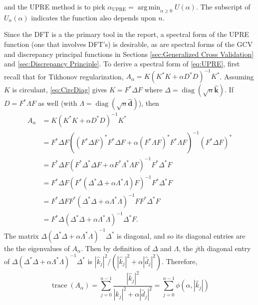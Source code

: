 \documentclass[12pt,notitlepage]{report}
\newcommand{\kVec}{\mathbf{k}}	%
\newcommand{\kMat}{K}	%
\newcommand{\dVec}{\mathbf{d}}	%
\newcommand{\ctrans}{*}	%
\DeclareMathOperator{\trace}{trace}		%
\DeclareMathOperator{\diag}{diag}	%
\newcommand{\regparam}{\alpha}
\DeclareMathOperator*{\argmin}{arg\,min}
\newcommand{\filt}{\phi}
\newcommand{\A}{A_{\regparam}}	%
\newcommand{\U}{U}	%
\begin{document}
and the UPRE method is to pick $\regparam_{\text{UPRE}} = \argmin_{\regparam \geq 0} \U(\regparam)$. The subscript of $\U_n(\regparam)$ indicates the function also depends upon $n$. \par 
Since the DFT is a the primary tool in the report, a spectral form of the UPRE function (one that involves DFT's) is desirable, as are spectral forms of the GCV and discrepancy principal functions in Sections \ref{sec:Generalized Cross Validation} and \ref{sec:Discrepancy Principle}. To derive a spectral form of \eqref{eq:UPRE}, first recall that for Tikhonov regularization, $\A = \kMat(\kMat^\ctrans\kMat + \regparam{D^\ctrans}D)^{-1}\kMat^\ctrans$. Assuming $\kMat$ is circulant, \eqref{eq:CircDiag} gives $\kMat = F^\ctrans\Delta{F}$ where $\Delta = \diag(\sqrt{n}\widehat{\kVec})$. If $D = F^\ctrans\Lambda{F}$ as well (with $\Lambda = \diag(\sqrt{n}\widehat{\dVec})$), then
\begin{align*}
\A &= \kMat(\kMat^\ctrans\kMat + \regparam{D^\ctrans}D)^{-1}\kMat^\ctrans \\
&= F^\ctrans\Delta{F}((F^\ctrans\Delta{F})^\ctrans F^\ctrans\Delta{F} + \regparam(F^\ctrans\Lambda{F})^\ctrans F^\ctrans\Lambda{F})^{-1}(F^\ctrans\Delta{F})^\ctrans \\
&= F^\ctrans\Delta{F}(F^\ctrans\Delta^\ctrans\Delta{F} + \regparam{F^\ctrans\Lambda^\ctrans\Lambda{F}})^{-1}F^\ctrans\Delta^\ctrans{F} \\
&= F^\ctrans\Delta{F}(F^\ctrans(\Delta^\ctrans\Delta + \regparam\Lambda^\ctrans\Lambda)F)^{-1}F^\ctrans\Delta^\ctrans{F} \\
&= F^\ctrans\Delta{F}F^\ctrans(\Delta^\ctrans\Delta + \regparam\Lambda^\ctrans\Lambda)^{-1}FF^\ctrans\Delta^\ctrans{F} \\
&= F^\ctrans\Delta(\Delta^\ctrans\Delta + \regparam\Lambda^\ctrans\Lambda)^{-1}\Delta^\ctrans{F}.
\end{align*}
The matrix $\Delta(\Delta^\ctrans\Delta + \regparam\Lambda^\ctrans\Lambda)^{-1}\Delta^\ctrans$ is diagonal, and so its diagonal entries are the the eigenvalues of $\A$. Then by definition of $\Delta$ and $\Lambda$, the $j$th diagonal entry of $\Delta(\Delta^\ctrans\Delta + \regparam\Lambda^\ctrans\Lambda)^{-1}\Delta^\ctrans$ is $|\widehat{k}_j|^2/(|\widehat{k}_j|^2 + \regparam|\widehat{d}_j|^2)$. Therefore,
\begin{equation}
\trace(\A) = \sum_{j = 0}^{n-1} \frac{|\widehat{k}_j|^2}{|\widehat{k}_j|^2 + \regparam|\widehat{d}_j|^2} = \sum_{j = 0}^{n-1} \filt(\regparam,|\widehat{k}_j|)
\label{eq:TraceUPRE}
\end{equation}
\end{document}
